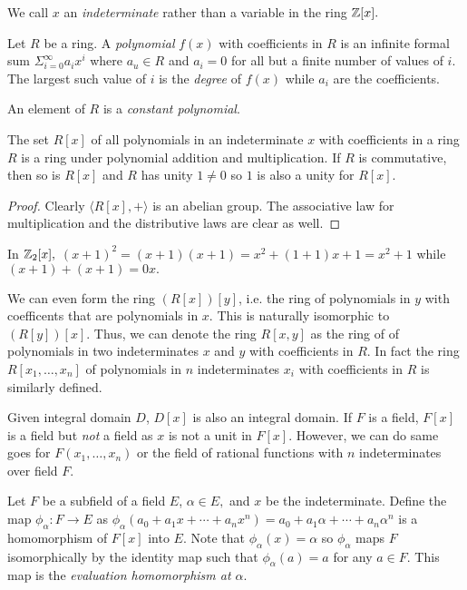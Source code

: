 \begin{note}
    We call $x$ an \emph{indeterminate} rather than a variable in the ring $\mathbb{Z}[x].$
\end{note}
\begin{definition}
    Let $R$ be a ring. A \emph{polynomial} $f(x)$ with coefficients in $R$ is an infinite formal sum $\Sigma_{i=0}^\infty a_ix^i$ where $a_u \in R$ and $a_i=0$ for all but a finite number of values of $i$. The largest such value of $i$ is the \emph{degree} of $f(x)$ while $a_i$ are the coefficients.
\end{definition}
\begin{note}
    An element of $R$ is a \emph{constant polynomial}.
\end{note}
\begin{theorem}
    The set $R[x]$ of all polynomials in an indeterminate $x$ with coefficients in a ring $R$ is a ring under polynomial addition and multiplication. If $R$ is commutative, then so is $R[x]$ and $R$ has unity $1 \neq 0$ so $1$ is also a unity for $R[x].$
\end{theorem}
\begin{proof}
    Clearly $\langle R[x], + \rangle$ is an abelian group. The associative law for multiplication and the distributive laws are clear as well.
\end{proof}
\begin{example}
    In $\mathbb{Z}_2[x],$ $(x+1)^2 = (x+1)(x+1) = x^2 + (1+1)x + 1 = x^2 + 1$ while $(x+1) + (x+1) = 0x.$
\end{example}
\begin{example}
    We can even form the ring $(R[x])[y]$, i.e. the ring of polynomials in $y$ with coefficents that are polynomials in $x$. This is naturally isomorphic to $(R[y])[x]$. Thus, we can denote the ring $R[x,y]$ as the ring of of polynomials in two indeterminates $x$ and $y$ with coefficients in $R$. In fact the ring $R[x_1, \ldots, x_n]$ of polynomials in $n$ indeterminates $x_i$ with coefficients in $R$ is similarly defined. 
    
    Given integral domain $D$, $D[x]$ is also an integral domain. If $F$ is a field, $F[x]$ is a field but \emph{not} a field as $x$ is not a unit in $F[x]$. However, we can do same goes for $F(x_1, \ldots, x_n)$ or the field of rational functions with $n$ indeterminates over field $F$.
\end{example}
\begin{theorem}
    Let $F$ be a subfield of a field $E$, $\alpha \in E,$ and $x$ be the indeterminate. Define the map $\phi_\alpha\colon F\to E$ as $\phi_\alpha(a_0+a_1x + \cdots + a_nx^n) = a_0 + a_1\alpha + \cdots + a_n\alpha^n$ is a homomorphism of $F[x]$ into $E$. Note that $\phi_\alpha(x) = \alpha$ so $\phi_\alpha$ maps $F$ isomorphically by the identity map such that $\phi_\alpha(a) = a$ for any $a \in F$. This map is the \emph{evaluation homomorphism at $\alpha$}.
\end{theorem}
